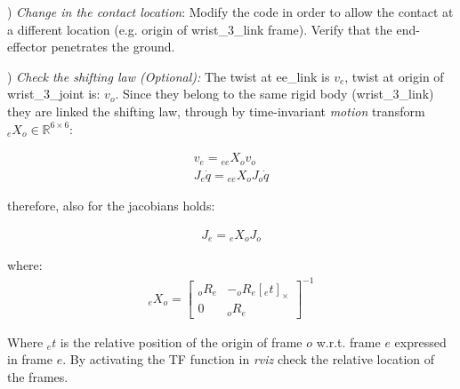 \documentclass{report}
\newcommand{\Rnum}{\mathbb{R}} %
\newcommand{\mat}[1]{\ensuremath{\begin{bmatrix}#1\end{bmatrix}}}	%
\begin{document}
\quad

)  \textit{Change in the contact location}:
Modify the code in order to allow the contact at a different location (e.g. origin of wrist\_3\_link frame).  Verify that the end-effector penetrates the ground. 

\quad

) \textit{Check the shifting law (Optional):}
The twist at ee\_link is $v_{e}$, twist at origin of wrist\_3\_joint is: $v_o$. Since they belong to the same rigid body (wrist\_3\_link) they are linked the shifting law, through by time-invariant \textit{motion} transform ${}_{e}X_o \in \Rnum^{6 \times 6}$:

\begin{align}
  v_{e} = {}_{ee}X_o v_o\\
  J_{e} \dot{q} = {}_{ee}X_o J_o \dot{q}
	\label{fig:}
\end{align}

therefore, also for the jacobians holds:

\begin{align}
J_{e}  = {}_{e}X_o J_o
\label{fig:}
\end{align}

where: 
\begin{align}
{}_{e}X_o  = \mat{ {}_{o}R_e   &  -{}_o R_e [{}_{e}t]_{\times} \\
					0             &     {}_oR_{e}} ^{-1}
\label{fig:}
\end{align}

Where ${}_{e}t$ is the relative position of the origin of frame ${o}$ w.r.t. frame $e$ expressed 
in frame ${e}$.
By activating the TF function in \textit{rviz} check the relative location of the frames. 

 
\end{document}
